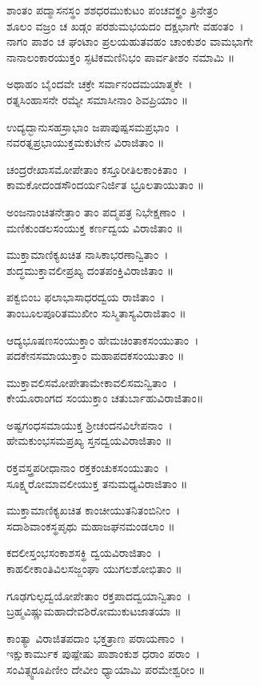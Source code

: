 ಶಾಂತಂ ಪದ್ಮಾಸನಸ್ಥಂ ಶಶಧರಮುಕುಟಂ ಪಂಚವಕ್ತ್ರಂ ತ್ರಿನೇತ್ರಂ\\
ಶೂಲಂ ವಜ್ರಂ ಚ ಖಡ್ಗಂ ಪರಶುಮಭಯದಂ ದಕ್ಷಭಾಗೇ ವಹಂತಂ~।\\
ನಾಗಂ ಪಾಶಂ ಚ ಘಂಟಾಂ ಪ್ರಲಯಹುತವಹಂ ಚಾಂಕುಶಂ ವಾಮಭಾಗೇ\\
ನಾನಾಲಂಕಾರಯುಕ್ತಂ ಸ್ಫಟಿಕಮಣಿನಿಭಂ ಪಾರ್ವತೀಶಂ ನಮಾಮಿ ॥

ಅಥಾಹಂ ಬೈಂದವೇ ಚಕ್ರೇ ಸರ್ವಾನಂದಮಯಾತ್ಮಕೇ~।\\
ರತ್ನಸಿಂಹಾಸನೇ ರಮ್ಯೇ ಸಮಾಸೀನಾಂ ಶಿವಪ್ರಿಯಾಂ ॥

ಉದ್ಯದ್ಭಾನುಸಹಸ್ರಾಭಾಂ ಜಪಾಪುಷ್ಪಸಮಪ್ರಭಾಂ~।\\
ನವರತ್ನಪ್ರಭಾಯುಕ್ತಮಕುಟೇನ ವಿರಾಜಿತಾಂ ॥

ಚಂದ್ರರೇಖಾಸಮೋಪೇತಾಂ ಕಸ್ತೂರೀತಿಲಕಾಂಕಿತಾಂ~।\\
ಕಾಮಕೋದಂಡಸೌಂದರ್ಯನಿರ್ಜಿತ ಭ್ರೂಲತಾಯುತಾಂ ॥

ಅಂಜನಾಂಚಿತನೇತ್ರಾಂ ತಾಂ ಪದ್ಮಪತ್ರ ನಿಭೇಕ್ಷಣಾಂ~।\\
ಮಣಿಕುಂಡಲಸಂಯುಕ್ತ ಕರ್ಣದ್ವಯ ವಿರಾಜಿತಾಂ ॥

ಮುಕ್ತಾಮಾಣಿಕ್ಯಖಚಿತ ನಾಸಿಕಾಭರಣಾನ್ವಿತಾಂ~।\\
ಶುದ್ಧಮುಕ್ತಾವಲೀಪ್ರಖ್ಯ ದಂತಪಂಕ್ತಿವಿರಾಜಿತಾಂ ॥

ಪಕ್ವಬಿಂಬ ಫಲಾಭಾಸಾಧರದ್ವಯ ರಾಜಿತಾಂ~।\\
ತಾಂಬೂಲಪೂರಿತಮುಖೀಂ ಸುಸ್ಮಿತಾಸ್ಯವಿರಾಜಿತಾಂ ॥

ಆದ್ಯಭೂಷಣಸಂಯುಕ್ತಾಂ ಹೇಮಚಿಂತಾಕಸಂಯುತಾಂ~।\\
ಪದಕೇನಸಮಾಯುಕ್ತಾಂ ಮಹಾಪದಕಸಂಯುತಾಂ ॥

ಮುಕ್ತಾವಲಿಸಮೋಪೇತಾಮೇಕಾವಲಿಸಮನ್ವಿತಾಂ~।\\
ಕೇಯೂರಾಂಗದ ಸಂಯುಕ್ತಾಂ ಚತುರ್ಬಾಹುವಿರಾಜಿತಾಂ॥

ಅಷ್ಟಗಂಧಸಮಾಯುಕ್ತ ಶ್ರೀಚಂದನವಿಲೇಪನಾಂ~।\\
ಹೇಮಕುಂಭಸಮಪ್ರಖ್ಯ ಸ್ತನದ್ವಯವಿರಾಜಿತಾಂ ॥

ರಕ್ತವಸ್ತ್ರಪರೀಧಾನಾಂ ರಕ್ತಕಂಚುಕಸಂಯುತಾಂ~।\\
ಸೂಕ್ಷ್ಮರೋಮಾವಲೀಯುಕ್ತ ತನುಮಧ್ಯವಿರಾಜಿತಾಂ ॥

ಮುಕ್ತಾಮಾಣಿಕ್ಯಖಚಿತ ಕಾಂಚೀಯುತನಿತಂಬಿನೀಂ~।\\
ಸದಾಶಿವಾಂಕಸ್ಥಪೃಥು ಮಹಾಜಘನಮಂಡಲಾಂ ॥

ಕದಲೀಸ್ತಂಭಸಂಕಾಶಸಕ್ಥಿ ದ್ವಯವಿರಾಜಿತಾಂ~।\\
ಕಾಹಲೀಕಾಂತಿವಿಲಸಜ್ಜಂಘಾ ಯುಗಲಶೋಭಿತಾಂ ॥

ಗೂಢಗುಲ್ಫದ್ವಯೋಪೇತಾಂ ರಕ್ತಪಾದದ್ವಯಾನ್ವಿತಾಂ~।\\
ಬ್ರಹ್ಮವಿಷ್ಣುಮಹಾದೇವಶಿರೋಮುಕುಟಜಾತಯಾ ॥

ಕಾಂತ್ಯಾ ವಿರಾಜಿತಪದಾಂ ಭಕ್ತತ್ರಾಣ ಪರಾಯಣಾಂ~।\\
ಇಕ್ಷುಕಾರ್ಮುಕ ಪುಷ್ಪೇಷು ಪಾಶಾಂಕುಶ ಧರಾಂ ಪರಾಂ~।\\
ಸಂವಿತ್ಸ್ವರೂಪಿಣೀಂ ದೇವೀಂ ಧ್ಯಾಯಾಮಿ ಪರಮೇಶ್ವರೀಂ ॥

